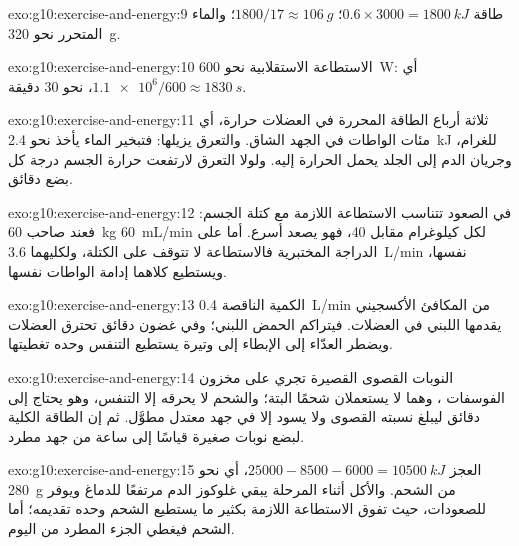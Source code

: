 \begin{solution}{exo:g10:exercise-and-energy:9}
طاقة  $0.6 \times 3000 = \qty{1800}{kJ}$؛ 
$1800/17 \approx \qty{106}{g}$؛ والماء المتحرر نحو \qty{320}{g}.
\end{solution}

\begin{solution}{exo:g10:exercise-and-energy:10}
الاستطاعة الاستقلابية نحو \qty{600}{W}: أي $\num{1.1e6}/600 \approx
\qty{1830}{s}$، نحو 30 دقيقة.
\end{solution}

\begin{solution}{exo:g10:exercise-and-energy:11}
ثلاثة أرباع الطاقة المحررة في العضلات حرارة، أي مئات الواطات في الجهد
الشاق. والتعرق يزيلها: فتبخير الماء يأخذ نحو \qty{2.4}{kJ} للغرام،
وجريان الدم إلى الجلد يحمل الحرارة إليه. ولولا التعرق لارتفعت حرارة
الجسم درجة كل بضع دقائق.
\end{solution}

\begin{solution}{exo:g10:exercise-and-energy:12}
في الصعود تتناسب الاستطاعة اللازمة مع كتلة الجسم: فعند صاحب
\qty{60}{kg} \qty{60}{mL/min} لكل كيلوغرام مقابل \num{40}، فهو يصعد
أسرع. أما على الدراجة المختبرية فالاستطاعة لا تتوقف على الكتلة،
ولكليهما \qty{3.6}{L/min} نفسها، ويستطيع كلاهما إدامة الواطات نفسها.
\end{solution}

\begin{solution}{exo:g10:exercise-and-energy:13}
الكمية الناقصة \qty{0.4}{L/min} من المكافئ الأكسجيني يقدمها  اللبني
في العضلات. فيتراكم الحمض اللبني؛ وفي غضون دقائق تحترق العضلات ويضطر
العدّاء إلى الإبطاء إلى وتيرة يستطيع التنفس وحده تغطيتها.
\end{solution}

\begin{solution}{exo:g10:exercise-and-energy:14}
النوبات القصوى القصيرة تجري على مخزون الفوسفات ، وهما لا
يستعملان شحمًا البتة؛ والشحم لا يحرقه إلا التنفس، وهو يحتاج إلى دقائق
ليبلغ نسبته القصوى ولا يسود إلا في جهد معتدل مطوَّل. ثم إن الطاقة
الكلية لبضع نوبات صغيرة قياسًا إلى ساعة من جهد مطرد.
\end{solution}

\begin{solution}{exo:g10:exercise-and-energy:15}
العجز $25000 - 8500 - 6000 = \qty{10500}{kJ}$، أي نحو \qty{280}{g} من
الشحم. والأكل أثناء المرحلة يبقي غلوكوز الدم مرتفعًا للدماغ ويوفر
 للصعودات، حيث تفوق الاستطاعة اللازمة بكثير ما يستطيع الشحم
وحده تقديمه؛ أما الشحم فيغطي الجزء المطرد من اليوم.
\end{solution}

